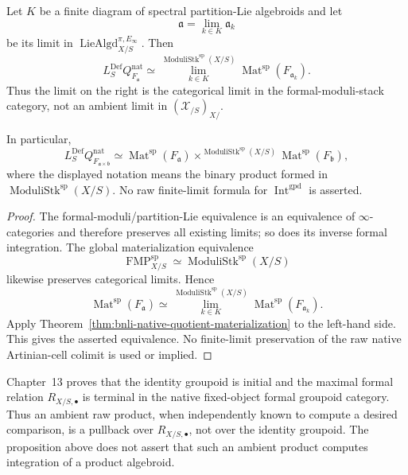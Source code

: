 \begin{proposition}
\label{prop:bnli-products}
Let $K$ be a finite diagram of spectral partition-Lie algebroids and let
\[
    \mathfrak a
    =
    \operatorname*{lim}_{k\in K}
    \mathfrak a_k
\]
be its limit in
$\operatorname{LieAlgd}^{\pi,E_\infty}_{X/S}$.  Then
\[
\boxed{
    L_S^{\mathrm{Def}}Q^{\mathrm{nat}}_{F_{\mathfrak a}}
    \simeq
    \operatorname*{lim}^{\operatorname{ModuliStk}^{\mathrm{sp}}(X/S)}_{k\in K}
    \operatorname{Mat}^{\mathrm{sp}}(F_{\mathfrak a_k}).}
\]
Thus the limit on the right is the categorical limit in the
formal-moduli-stack category, not an ambient limit in
$(\mathcal X_{/S})_{X/}$.

In particular,
\[
    L_S^{\mathrm{Def}}Q^{\mathrm{nat}}_{F_{\mathfrak a\times\mathfrak b}}
    \simeq
    \operatorname{Mat}^{\mathrm{sp}}(F_{\mathfrak a})
    \mathop{\times}^{\operatorname{ModuliStk}^{\mathrm{sp}}(X/S)}
    \operatorname{Mat}^{\mathrm{sp}}(F_{\mathfrak b}),
\]
where the displayed notation means the binary product formed in
$\operatorname{ModuliStk}^{\mathrm{sp}}(X/S)$.  No raw finite-limit formula
for $\operatorname{Int}^{\mathrm{gpd}}$ is asserted.
\end{proposition}

\begin{proof}
The formal-moduli/partition-Lie equivalence is an equivalence of
$\infty$-categories and therefore preserves all existing limits; so does its
inverse formal integration.  The global materialization equivalence
\[
    \operatorname{FMP}^{\mathrm{sp}}_{X/S}
    \simeq
    \operatorname{ModuliStk}^{\mathrm{sp}}(X/S)
\]
likewise preserves categorical limits.  Hence
\[
    \operatorname{Mat}^{\mathrm{sp}}(F_{\mathfrak a})
    \simeq
    \operatorname*{lim}^{\operatorname{ModuliStk}^{\mathrm{sp}}(X/S)}_{k\in K}
    \operatorname{Mat}^{\mathrm{sp}}(F_{\mathfrak a_k}).
\]
Apply Theorem~\ref{thm:bnli-native-quotient-materialization} to the left-hand
side.  This gives the asserted equivalence.  No finite-limit preservation of
the raw native Artinian-cell colimit is used or implied.
\end{proof}

\begin{remark}
Chapter~13 proves that the identity groupoid is initial and the maximal formal
relation $R_{X/S,\bullet}$ is terminal in the native fixed-object formal
groupoid category.  Thus an ambient raw product, when independently known to
compute a desired comparison, is a pullback over $R_{X/S,\bullet}$, not over
the identity groupoid.  The proposition above does not assert that such an
ambient product computes integration of a product algebroid.
\end{remark}

